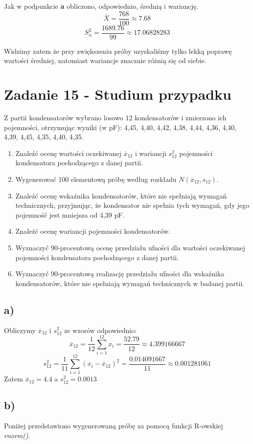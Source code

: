 \documentclass{article}
\begin{document}
Jak w podpunkcie \textbf{a} obliczono, odpowiednio, średnią i wariancję.
\[ \overline{X} = \frac{768}{100} \approx 7.68 \]
\[ S^2_n = \frac{1689.76}{99} \approx 17.06828283 \]

Widzimy zatem że przy zwiększeniu próby uzyskaliśmy tylko lekką poprawę wartości średniej, natomiast wariancje znacznie różnią się od siebie.

\newpage
\section{Zadanie 15 - Studium przypadku}
Z partii kondensatorów wybrano losowo 12 kondensatorów i zmierzono ich pojemności, otrzymując wyniki (w pF):
4,45, 4,40, 4,42, 4,38, 4,44, 4,36, 4,40, 4,39, 4,45, 4,35, 4,40, 4,35.
\begin{enumerate}[label = \alph*)]
\item Znaleźć ocenę wartości oczekiwanej $\overline{x}_{12}$ i wariancji $s_{12}^2$ pojemności kondensatora pochodzącego z danej partii.
\item Wygenerować 100 elementową próbę według rozkładu $N(\overline{x}_{12},s_{12})$.
\item Znaleźć ocenę wskaźnika kondensatorów, które nie spełniają wymagań technicznych, przyjmując, że kondensator nie spełnia tych wymagań, gdy jego pojemność jest mniejsza od 4,39 pF.
\item Znaleźć ocenę wariancji pojemności kondensatorów.
\item Wyznaczyć 90-procentową ocenę przedziału ufności dla wartości oczekiwanej pojemności kondensatora pochodzącego z danej partii.
\item Wyznaczyć 90-procentową realizację przedziału ufności dla wskaźnika kondensatorów, które nie spełniają wymagań technicznych w badanej partii.
\end{enumerate}

\subsection{a)}
Obliczymy $\overline{x}_{12}$ i $s_{12}^2$ ze wzorów odpowiednio:
\[ \overline{x}_{12} = \frac{1}{12} \sum_{i=1}^{12} x_i = \frac{52.79}{12} \approx 4.399166667 \]
\[ s_{12}^2 = \frac{1}{11} \sum_{i=1}^{12} (x_i - \overline{x}_{12})^2 = \frac{0.014091667}{11} \approx 0.001281061 \]
Zatem $\overline{x}_{12} = 4.4$ a $s_{12}^2 = 0.0013$

\subsection{b)}
Poniżej przedstawiono wygenerowaną próbę za pomocą funkcji R-owskiej \textit{rnorm()}.
\begin{center}
\end{center}
\end{document}
